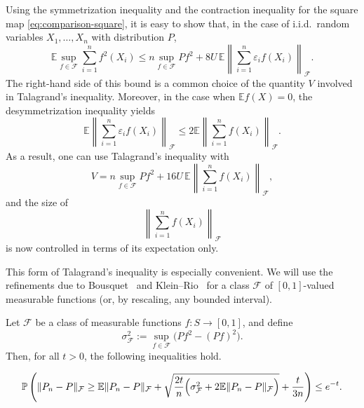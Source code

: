 
Using the symmetrization inequality and the contraction inequality for the square map \eqref{eq:comparison-square}, it is easy to show that, in the case of i.i.d.\ random variables $X_1,\ldots,X_n$ with distribution $P$,
\begin{equation} \label{eq:talagrand-variance}
  \mathbb{E}\sup_{f\in\mathcal{F}} \sum_{i=1}^n f^2(X_i)
  \le
  n\sup_{f\in\mathcal{F}} Pf^2
  +
  8U\,\mathbb{E}\left\|
  \sum_{i=1}^n \varepsilon_i f(X_i)
  \right\|_{\mathcal{F}}.
\end{equation}
The right-hand side of this bound is a common choice of the quantity $V$ involved in Talagrand's inequality. Moreover, in the case when $\mathbb{E}f(X)=0$, the desymmetrization inequality yields
\[
  \mathbb{E}\left\|
  \sum_{i=1}^n \varepsilon_i f(X_i)
  \right\|_{\mathcal{F}}
  \le
  2\mathbb{E}\left\|
  \sum_{i=1}^n f(X_i)
  \right\|_{\mathcal{F}}.
\]
As a result, one can use Talagrand's inequality with
\[
  V
  =
  n\sup_{f\in\mathcal{F}} Pf^2
  +
  16U\,\mathbb{E}\left\|
  \sum_{i=1}^n f(X_i)
  \right\|_{\mathcal{F}},
\]
and the size of
\[
  \left\|
  \sum_{i=1}^n f(X_i)
  \right\|_{\mathcal{F}}
\]
is now controlled in terms of its expectation only.

\smallskip

This form of Talagrand's inequality is especially convenient. We will use the
refinements due to Bousquet~\cite{bousquet2002bennett} and Klein--Rio~\cite{klein2002inegalite,klein2005concentration} for a class $\mathcal{F}$ of $[0,1]$-valued measurable functions (or, by rescaling, any bounded interval).

\smallskip

Let $\mathcal F$ be a class of measurable functions $f:S\to[0,1]$, and define
\begin{equation*}
  \sigma_{\mathcal F}^2:=\sup_{f\in\mathcal F}\bigl(P f^2-(P f)^2\bigr).
\end{equation*}
Then, for all $t>0$, the following inequalities hold.

\begin{theorem}[Bousquet]\label{thm:bousquet}
  \[
    \mathbb{P}\left(
    \|P_n-P\|_{\mathcal F}
    \ge
    \mathbb{E}\|P_n-P\|_{\mathcal F}
    +\sqrt{\frac{2t}{n}\Bigl(\sigma_{\mathcal F}^2+2\mathbb{E}\|P_n-P\|_{\mathcal F}\Bigr)}
    +\frac{t}{3n}
    \right)
    \le e^{-t}.
  \]
\end{theorem}

